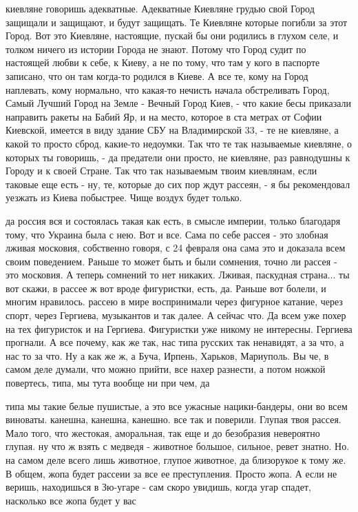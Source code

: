 киевляне говоришь адекватные. Адекватные Киевляне грудью свой Город защищали и
защищают, и будут защищать. Те Киевляне которые погибли за этот Город. Вот это
Киевляне, настоящие, пускай бы они родились в глухом селе, и толком ничего из
истории Города не знают. Потому что Город судит по настоящей любви к себе, к
Киеву, а не по тому, что там у кого в паспорте записано, что он там когда-то
родился в Киеве. А все те, кому на Город наплевать, кому нормально, что
какая-то нечисть начала обстреливать Город, Самый Лучший Город на Земле -
Вечный Город Киев, - что какие бесы приказали направить ракеты на Бабий Яр, и
на место, которое в ста метрах от Софии Киевской, имеется в виду здание СБУ на
Владимирской 33, - те не киевляне, а какой то просто сброд, какие-то недоумки.
Так что те так называемые киевляне, о которых ты говоришь, - да предатели они
просто, не киевляне, раз равнодушны к Городу и к своей Стране. Так что так
называемым твоим киевлянам, если таковые еще есть - ну, те, которые до сих пор
ждут рассеян, - я бы рекомендовал уезжать из Киева побыстрее. Чище воздух будет
только.

да россия вся и состоялась такая как есть, в смысле империи, только благодаря
тому, что Украина была с нею. Вот и все. Сама по себе рассея - это злобная
лживая московия, собственно говоря, с 24 февраля она сама это и доказала всем
своим поведением. Раньше то может быть и были сомнения, точно ли рассея - это
московия. А теперь сомнений то нет никаких. Лживая, паскудная страна... ты вот
скажи, в рассее ж вот вроде фигуристки, есть, да. Раньше вот болели, и многим
нравилось. рассею в мире воспринимали через фигурное катание, через спорт,
через Гергиева, музыкантов и так далее. А сейчас что. Да всем уже похер на тех
фигуристок и на Гергиева. Фигуристки уже никому не интересны. Гергиева
прогнали. А все почему, как же так, нас типа русских так ненавидят, а за что, а
нас то за что. Ну а как же ж, а Буча, Ирпень, Харьков, Мариуполь. Вы че, в
самом деле думали, что можно прийти, все нахер разнести, а потом ножкой
повертесь, типа, мы тута вообще ни при чем, да

типа мы такие белые пушистые, а это все ужасные нацики-бандеры, они во всем
виноваты. канешна, канешна, канешно. все так и поверили. Глупая твоя рассея.
Мало того, что жестокая, аморальная, так еще и до безобразия невероятно глупая.
ну что ж взять с медведя - животное большое, сильное, ревет знатно. Но. на
самом деле всего лишь животное, глупое животное, да близорукое к тому же. В
общем, жопа будет рассеии за все ее преступления. Просто жопа. А если не
веришь, находишься в Зю-угаре - сам скоро увидишь, когда угар спадет, насколько
все жопа будет у вас

